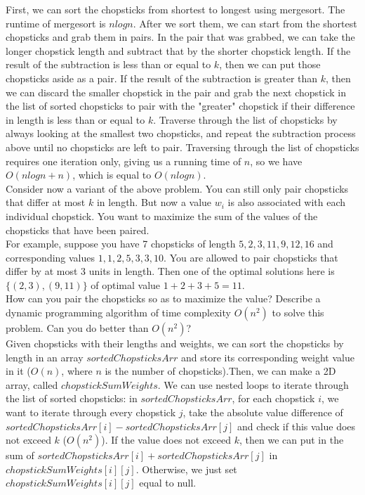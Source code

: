 \documentclass{article}
\begin{document}
\noindent First, we can sort the chopsticks from shortest to longest using mergesort. The runtime of mergesort is $nlogn$. After we sort them, we can start from the shortest chopsticks and grab them in pairs. In the pair that was grabbed, we can take the longer chopstick length and subtract that by the shorter chopstick length. If the result of the subtraction is less than or equal to $k$, then we can put those chopsticks aside as a pair. If the result of the subtraction is greater than $k$, then we can discard the smaller chopstick in the pair and grab the next chopstick in the list of sorted chopsticks to pair with the "greater" chopstick if their difference in length is less than or equal to $k$. Traverse through the list of chopsticks by always looking at the smallest two chopsticks, and repeat the subtraction process above until no chopsticks are left to pair. Traversing through the list of chopsticks requires one iteration only, giving us a running time of $n$, so we have $O(nlogn + n)$, which is equal to $O(nlogn)$.\\

 Consider now a variant of the above problem. You
can still only pair chopsticks that differ at most $k$ in length. But
now a value $w_{i}$ is also associated with each individual
chopstick. You want to maximize the sum of the values of the
chopsticks that have been paired.\\

\noindent For example, suppose you have 7 chopsticks of length
$5,2,3,11,9,12,16$ and corresponding values $1,1,2,5,3,3,10$. You are
allowed to pair chopsticks that differ by at most 3 units in
length. Then one of the optimal solutions here is $\{ (2,3),(9,11) \}$
of optimal value $1+2+3+5=11$.\\

\noindent How can you pair the chopsticks so as to maximize the value?
Describe a dynamic programming algorithm of time complexity $O(n^{2})$
to solve this problem. Can you do better than $O(n^{2})$?\\

\noindent Given chopsticks with their lengths and weights, we can sort the chopsticks by length in an array $sortedChopsticksArr$ and store its corresponding weight value in it ($O(n)$, where $n$ is the number of chopsticks).Then, we can make a 2D array, called $chopstickSumWeights$. We can use nested loops to iterate through the list of sorted chopsticks: in $sortedChopsticksArr$, for each chopstick $i$, we want to iterate through every chopstick $j$, take the absolute value difference of $sortedChopsticksArr[i]-sortedChopsticksArr[j]$ and check if this value does not exceed $k$ ($O(n^2)$). If the value does not exceed $k$, then we can put in the sum of $sortedChopsticksArr[i]+sortedChopsticksArr[j]$ in $chopstickSumWeights[i][j]$. Otherwise, we just set $chopstickSumWeights[i][j]$ equal to null.\\
\end{document}
